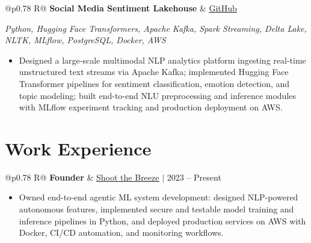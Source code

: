 \documentclass[a4paper,10pt]{article}
\newcommand{\ulink}[2]{\href{#1}{\uline{#2}}}
\newcommand{\subheading}[1]{{\color[HTML]{0A0A0A}\fontsize{12}{14}\selectfont\bfseries #1}}
\newcommand{\techstack}[1]{{\color[HTML]{5C5C5C}\fontsize{10.5}{12.5}\selectfont\itshape #1}}
\newcommand{\meta}[1]{{\color[HTML]{5C5C5C}\fontsize{10.5}{12.5}\selectfont #1}}
\begin{document}
\newpage

\vspace{2pt}

\begin{tabularx}{\linewidth}{@{}p{0.78\linewidth} R@{}}
\subheading{Social Media Sentiment Lakehouse} & \meta{\ulink{https://github.com/su-jin1425/Social-Media-Sentiment-Lakehouse}{GitHub}}
\end{tabularx}
\vspace{1pt}
\techstack{Python, Hugging Face Transformers, Apache Kafka, Spark Streaming, Delta Lake, NLTK, MLflow, PostgreSQL, Docker, AWS}
\begin{itemize}[nosep, leftmargin=1.5em, itemsep=1pt, topsep=2pt]
\item {\color[HTML]{0A0A0A}\fontsize{11}{14}\selectfont
Designed a large-scale multimodal NLP analytics platform ingesting real-time unstructured text streams via Apache Kafka; implemented Hugging Face Transformer pipelines for sentiment classification, emotion detection, and topic modeling; built end-to-end NLU preprocessing and inference modules with MLflow experiment tracking and production deployment on AWS.}
\end{itemize}

\vspace{2pt}

\section{Work Experience}
\vspace{2pt}

\begin{tabularx}{\linewidth}{@{}p{0.78\linewidth} R@{}}
\subheading{Founder} & \meta{\ulink{https://shoot-the-breeze.vercel.app}{Shoot the Breeze} $|$ 2023 -- Present}
\end{tabularx}
\begin{itemize}[nosep, leftmargin=1.5em, itemsep=1pt, topsep=2pt]
\item {\color[HTML]{0A0A0A}\fontsize{11}{14}\selectfont
Owned end-to-end agentic ML system development: designed NLP-powered autonomous features, implemented secure and testable model training and inference pipelines in Python, and deployed production services on AWS with Docker, CI/CD automation, and monitoring workflows.}
\end{itemize}

\vspace{2pt}
\end{document}
